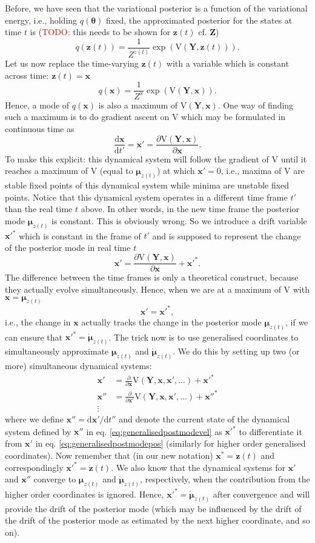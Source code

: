 \documentclass[a4paper,10pt]{article}
\newcommand{\todo}{\textcolor{red}{TODO: }}
\newcommand{\bs}[1]{\mathbf{#1}}					%
\newcommand{\bgs}[1]{\boldsymbol{#1}}				%
\newcommand{\ud}{\mathrm{d}}					%
\newcommand{\pd}[2]{\frac{\partial #1}{\partial #2}} 	%
\newcommand{\eq}[1]{\begin{equation} #1 \end{equation}}%
\renewcommand{\ss}{z}         %
\newcommand{\sh}{x}         %
\newcommand{\spm}{\mu}    %
\renewcommand{\sp}{\theta}    %
\newcommand{\ps}{\bs{\ss}}    %
\newcommand{\ph}{\bs{\sh}}    %
\newcommand{\ppm}{\bgs{\spm}}   %
\newcommand{\pp}{\bgs{\sp}} %
\newcommand{\Ps}{\bs{Z}}    %
\newcommand{\Po}{\bs{Y}}    %
\newcommand{\V}{\mathrm{V}}			%
\begin{document}
Before, we have seen that the variational posterior is a function of the variational energy, i.e., holding $q(\pp)$ fixed, the approximated posterior for the states at time $t$ is (\todo this needs to be shown for $\ps(t)$ cf. $\Ps$)
\eq{
    q(\ps(t)) = \frac{1}{Z^{\ss(t)}}\exp\left(\V(\Po,\ps(t)) \right).
}
Let us now replace the time-varying $\ps(t)$ with a variable which is constant across time: $\ps(t)=\ph$
\eq{
    q(\ph) = \frac{1}{Z^{\sh}}\exp\left(\V(\Po,\ph) \right).
}
Hence, a mode of $q(\ph)$ is also a maximum of $\V(\Po,\ph)$. One way of finding such a maximum is to do gradient ascent on $\V$ which may be formulated in continuous time as
\eq{\label{eq:dynGradientAscent}
    \frac{\ud \ph}{\ud t'} = \ph' = \pd{\V(\Po,\ph)}{\ph}.
}
To make this explicit: this dynamical system will follow the gradient of $\V$ until it reaches a maximum of $\V$ (equal to $\ppm_{\ss(t)}$) at which $\ph'=0$, i.e., maxima of $\V$ are stable fixed points of this dynamical system while minima are unstable fixed points. Notice that this dynamical system operates in a different time frame $t'$ than the real time $t$ above. In other words, in the new time frame the posterior mode $\ppm_{\ss(t)}$ is constant. This is obviously wrong. So we introduce a drift variable $\ph'^*$ which is constant in the frame of $t'$ and is supposed to represent the change of the posterior mode in real time $t$
\eq{
    \ph' = \pd{\V(\Po,\ph)}{\ph} + \ph'^*.
}
The difference between the time frames is only a theoretical construct, because they actually evolve simultaneously. Hence, when we are at a maximum of $\V$ with $\ph=\ppm_{\ss(t)}$
\eq{
    \ph' = \ph'^*,
}
i.e., the change in $\ph$ actually tracks the change in the posterior mode $\ppm_{\ss(t)}$, if we can ensure that $\ph'^* = \dot{\ppm}_{\ss(t)}$. The trick now is to use generalised coordinates to simultaneously approximate $\ppm_{\ss(t)}$ and $\dot{\ppm}_{\ss(t)}$. We do this by setting up two (or more) simultaneous dynamical systems:
\begin{align}
    \label{eq:generalisedpostmodepos} \ph' &= \pd{}{\ph}\V(\Po,\ph,\ph',\dots) + \ph'^*\\
    \label{eq:generalisedpostmodevel} \ph'' &= \pd{}{\ph'}\V(\Po,\ph,\ph',\dots) + \ph''^*\\
    \vdots \nonumber
\end{align}
where we define $\ph'' = \ud \ph' / \ud t''$ and denote the current state of the dynamical system defined by $\ph''$ in eq. \eqref{eq:generalisedpostmodevel} as $\ph'^*$ to differentiate it from $\ph'$ in eq. \eqref{eq:generalisedpostmodepos} (similarly for higher order generalised coordinates). Now remember that (in our new notation) $\ph^* = \ps(t)$ and correspondingly $\ph'^* = \dot{\ps}(t)$. We also know that the dynamical systems for $\ph'$ and $\ph''$ converge to $\ppm_{\ss(t)}$ and $\dot{\ppm}_{\ss(t)}$, respectively, when the contribution from the higher order coordinates is ignored. Hence, $\ph'^* = \dot{\ppm}_{\ss(t)}$ after convergence and will provide the drift of the posterior mode (which may be influenced by the drift of the drift of the posterior mode as estimated by the next higher coordinate, and so on). 
\end{document}
